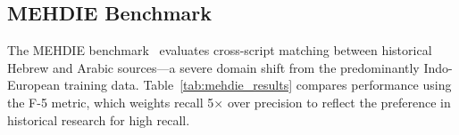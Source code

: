 \documentclass[11pt]{article}
\begin{document}
    \subsection{MEHDIE Benchmark}

    The MEHDIE benchmark~\citep{mehdie2025} evaluates cross-script matching between
    historical Hebrew and Arabic sources---a severe domain shift from the predominantly
    Indo-European training data. Table~\ref{tab:mehdie_results} compares performance
    using the F-5 metric, which weights recall 5$\times$ over precision to reflect
    the preference in historical research for high recall.

    \begin{table}[h]
        \centering
        \caption{MEHDIE Benchmark Results (Best F-5). MEHDIE baselines use linguistically
        engineered transliterations; AnyAscii baselines use naive character-by-character
        romanization matching the trained model's input.}
        \label{tab:mehdie_results}
    \end{table}
\end{document}
